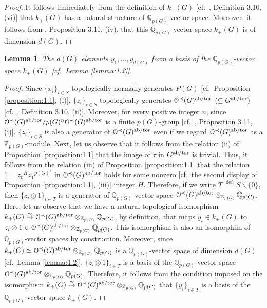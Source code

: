 \documentclass[11pt,showkeys]{article}
\theoremstyle{theorem}
\newtheorem{lem}[theorem]{Lemma}
\theoremstyle{definition}
\def\bZ{{\mathbb Z}}
\def\bQ{{\mathbb Q}}
\def\CalO{{\mathcal O}}
\def\defeq{ \ {\stackrel{\mathrm{def}}{=}} \ }
\begin{document}
\begin{proof}
It follows immediately from the definition of $k_{+}(G)$ [cf.\ \cite{Hoshi1}, Definition 3.10, (vi)] that $k_{+}(G)$ has a natural structure of ${\bQ}_{p(G)}$-vector space. Moreover, it follows from \cite{Hoshi1}, Proposition 3.11, (iv), that this $\bQ_{p(G)}$-vector space $k_{+}(G)$ is of dimension $d(G)$. 
\end{proof}

\begin{lem}\label{lemma:1.3} 
The $d(G)$ elements $y_1, \dots, y_{d(G)}$ form a basis of the $\bQ_{p(G)}$-vector space $k_{+}(G)$ [cf.\ Lemma \ref{lemma:1.2}]. 
\end{lem}

\begin{proof}
Since ${\{x_i\} }_{i \in S}$ topologically normally generates $P(G)$ [cf.\ Proposition \ref{proposition:1.1}, (i)], ${\{z_i\} }_{i \in S}$ topologically generates $\CalO^{\prec}(G)^{\rm ab/tor}$ $( \subseteq G^{\rm ab/tor} )$ [cf.\ \cite{Hoshi1}, Definition 3.10, (ii)]. Moreover, for every positive integer $n$, since $\CalO^{\prec}(G)^{\rm ab/tor} / p(G)^n\CalO^{\prec}(G)^{\rm ab/tor}$ is a finite $p(G)$-group [cf.\ \cite{Hoshi1}, Proposition 3.11, (i)], ${\{z_i\} }_{i \in S}$ is also a generator of $\CalO^{\prec}(G)^{\rm ab/tor}$ even if we regard $\CalO^{\prec}(G)^{\rm ab/tor}$ as a $\bZ_{p(G)}$-module. Next, let us observe that it follows from the relation (ii) of Proposition \ref{proposition:1.1} that the image of $\tau$ in $G^{\rm ab/tor}$ is trivial. Thus, it follows from the relation (iii) of Proposition \ref{proposition:1.1} that the relation $1={z_0}^{H}{z_1}^{{p(G)}^s}$ in $\CalO^{\prec}(G)^{\rm ab/tor}$ holds for some nonzero [cf.\ the second display of Proposition \ref{proposition:1.1}, (iii)] integer $H$. Therefore, if we write $T \defeq S \backslash \{0\}$, then ${\{z_i \otimes 1 \} }_{i \in T}$ is a generator of $\bQ_{p(G)}$-vector space $\CalO^{\prec}(G)^{\rm ab/tor} \otimes_{\bZ_{p(G)}}  \bQ_{p(G)}$. Here, let us observe that we have a natural topological isomorphism $k_{+}(G) \stackrel{\sim}{\to} \CalO^{\prec}(G)^{\rm ab/tor} \otimes_{\bZ_{p(G)}}  \bQ_{p(G)}$, by definition, that maps $y_i \in k_{+}(G)$ to $z_i \otimes 1 \in  \CalO^{\prec}(G)^{\rm ab/tor} \otimes_{\bZ_{p(G)}} \bQ_{p(G)}$. This isomorphism is also an isomorphim of $\bQ_{p(G)}$-vector spaces by construction. Moreover, since $k_{+}(G) \simeq \CalO^{\prec}(G)^{\rm ab/tor} \otimes_{\bZ_{p(G)}}  \bQ_{p(G)}$ is a $\bQ_{p(G)}$-vector space of dimension $d(G)$ [cf.\ Lemma \ref{lemma:1.2}], ${\{{z_i} \otimes 1 \} }_{i \in T}$ is a basis of the $\bQ_{p(G)}$-vector space $\CalO^{\prec}(G)^{\rm ab/tor} \otimes_{\bZ_{p(G)}}  \bQ_{p(G)}$. Therefore, it follows from the condition imposed on the isomorphism $k_{+}(G) \stackrel{\sim}{\to} \CalO^{\prec}(G)^{\rm ab/tor} \otimes_{\bZ_{p(G)}}  \bQ_{p(G)}$ that ${\{y_i\} }_{i \in T}$ is a basis of the $\bQ_{p(G)}$-vector space $k_{+}(G)$. 
\end{proof}
\end{document}
